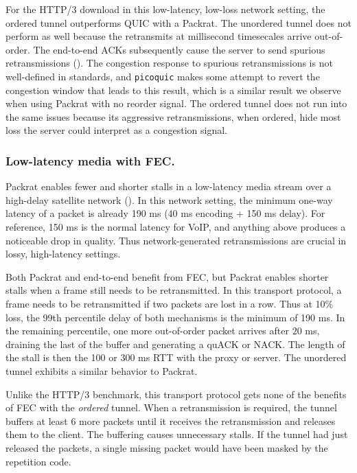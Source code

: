 For the HTTP/3 download in this low-latency, low-loss network setting, the
ordered tunnel outperforms QUIC with a Packrat. The unordered tunnel does not
perform as well because the retransmits at millisecond timesecales arrive
out-of-order. The end-to-end ACKs subsequently cause the server to send
spurious retransmissions (). The congestion response to
spurious retransmissions is not well-defined in standards, and \texttt
{picoquic} makes some attempt to revert the congestion window that leads to
this result, which is a similar result we observe when using Packrat with no
reorder signal. The ordered tunnel does not run into the same issues because
its aggressive retransmissions, when ordered, hide most loss the server could
interpret as a congestion signal.

\subsubsection{Low-latency media with FEC.}

Packrat enables fewer and shorter stalls in a low-latency media stream over a
high-delay satellite network (). In this network setting,
the minimum one-way latency of a packet is already 190 ms (40 ms encoding + 150
ms delay). For reference, 150 ms is the normal latency for VoIP, and anything
above produces a noticeable drop in quality. Thus network-generated
retransmissions are crucial in lossy, high-latency settings.

Both Packrat and end-to-end benefit from FEC, but Packrat enables shorter stalls when
a frame still needs to be retransmitted. In this transport protocol, a frame
needs to be retransmitted if two packets are lost in a row. Thus at 10\% loss,
the 99th percentile delay of both mechanisms is the minimum of 190 ms. In the
remaining percentile, one more out-of-order packet arrives after $20$ ms,
draining the last of the buffer and generating a quACK or NACK. The length of
the stall is then the 100 or 300 ms RTT with the proxy or server. The unordered
tunnel exhibits a similar behavior to Packrat.

Unlike the HTTP/3 benchmark, this transport protocol gets none of the benefits
of FEC with the \textit{ordered} tunnel. When a retransmission is required, the
tunnel buffers at least 6 more packets until it receives the retransmission and
releases them to the client. The buffering causes unnecessary stalls. If the
tunnel had just released the packets, a single missing packet would have been
masked by the repetition code.


